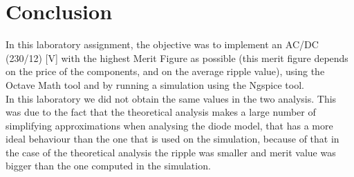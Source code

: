 

\section{Conclusion}
\label{sec:conclusion}



In this laboratory assignment, the objective was to implement an AC/DC (230/12) [V] with the highest Merit Figure as possible (this merit figure depends on the price of the components, and on the average ripple value), using the Octave Math tool and by running a simulation using the Ngspice tool.\\
In this laboratory we did not obtain the same values in the two analysis. This was due to the fact that the theoretical analysis makes a large number of simplifying approximations when analysing the diode model, that has a more ideal behaviour than the one that is used on the simulation, because of that in the case of the theoretical analysis the ripple was smaller and merit value was bigger than the one computed in the simulation.  





